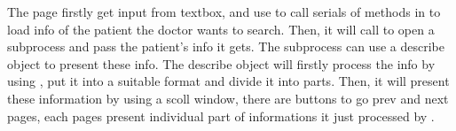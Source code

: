 \documentclass{article}
\begin{document}
The page firstly get input from textbox, and use 
 to call serials of methods in 
 to load info of the patient the 
doctor wants to search. Then, it will call  
to open a subprocess and pass the patient's info it gets. The 
subprocess can use a describe object to present these info.
The describe object will firstly process the info by using 
, put it into a suitable format 
and divide it into parts. Then, it will present these information 
by using a scoll window, there are buttons to go prev and next 
pages, each pages present individual part of informations it 
just processed by .
\end{document}
